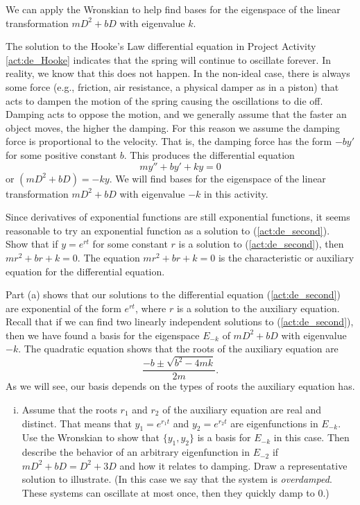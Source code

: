 We can apply the Wronskian to help find bases for the eigenspace of the linear transformation $mD^2 + bD$ with eigenvalue $k$. 

\begin{pactivity} The solution to the Hooke's Law differential equation in Project Activity \ref{act:de_Hooke} indicates that the spring will continue to oscillate forever. In reality, we know that this does not happen. In the non-ideal case, there is always some force (e.g., friction, air resistance, a physical damper as in a piston) that acts to dampen the motion of the spring causing the oscillations to die off. Damping acts to oppose the motion, and we generally assume that the faster an object moves, the higher the damping. For this reason we assume the damping force is proportional to the velocity. That is, the damping force has the form $-by'$ for some positive constant $b$. This produces the differential equation  
\begin{equation} \label{act:de_second} 
my'' + by' + ky = 0
\end{equation}
or $\left(mD^2+bD\right) = -ky$. 
We will find bases for the eigenspace of the linear transformation $mD^2+bD$ with eigenvalue $-k$ in this activity.
\ba
\item Since derivatives of exponential functions are still exponential functions, it seems reasonable to try an exponential function as a solution to (\ref{act:de_second}). Show that if $y = e^{rt}$ for some constant $r$ is a solution to (\ref{act:de_second}), then $mr^2+br+k = 0$. The equation $mr^2+br+k = 0$ is the characteristic or auxiliary equation for the differential equation. 

  
 \item Part (a) shows that our solutions to the differential equation (\ref{act:de_second}) are exponential of the form $e^{rt}$, where $r$ is a solution to the auxiliary equation. Recall that if we can find two linearly independent solutions to (\ref{act:de_second}), then we have found a basis for the eigenspace $E_{-k}$ of $mD^2+bD$ with eigenvalue $-k$. The quadratic equation shows that the roots of the auxiliary equation are 
 \[\frac{-b \pm \sqrt{b^2-4mk}}{2m}.\]
 As we will see, our basis depends on the types of roots the auxiliary equation has. 
 	\begin{enumerate}[i.]
	\item Assume that the roots $r_1$ and $r_2$ of the auxiliary equation are real and distinct. That means that $y_1 = e^{r_1t}$ and $y_2 = e^{r_2t}$ are eigenfunctions in $E_{-k}$. Use the Wronskian to show that $\{y_1, y_2\}$ is a basis for $E_{-k}$ in this case. Then describe the behavior of an arbitrary eigenfunction in $E_{-2}$ if $mD^2+bD = D^2+3D$ and how it relates to damping. Draw a representative solution to illustrate. (In this case we say that the system is \emph{overdamped}. These systems can oscillate at most once, then they quickly damp to $0$.)
	

\end{enumerate}
\end{pactivity}
